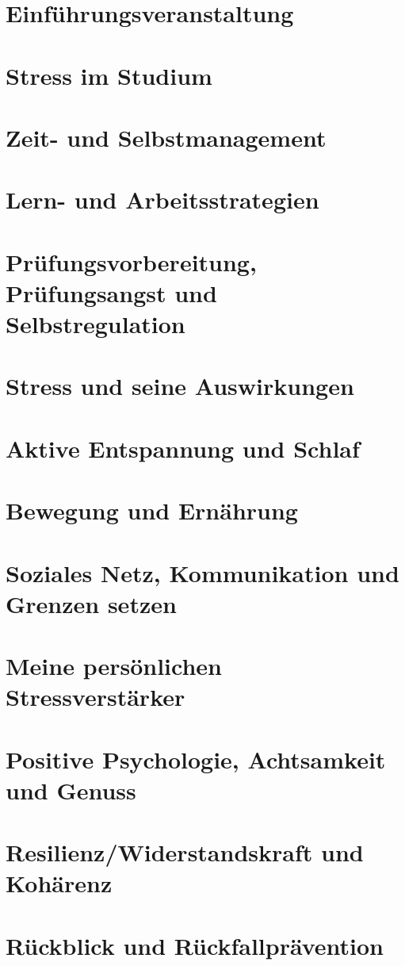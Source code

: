\section{Einführungsveranstaltung}

\section{Stress im Studium}

\section{Zeit- und Selbstmanagement}

\section{Lern- und Arbeitsstrategien}

\section{Prüfungsvorbereitung, Prüfungsangst und Selbstregulation}

\section{Stress und seine Auswirkungen}

\section{Aktive Entspannung und Schlaf}

\section{Bewegung und Ernährung}

\section{Soziales Netz, Kommunikation und Grenzen setzen}

\section{Meine persönlichen Stressverstärker}

\section{Positive Psychologie, Achtsamkeit und Genuss}

\section{Resilienz/Widerstandskraft und Kohärenz}

\section{Rückblick und Rückfallprävention}
